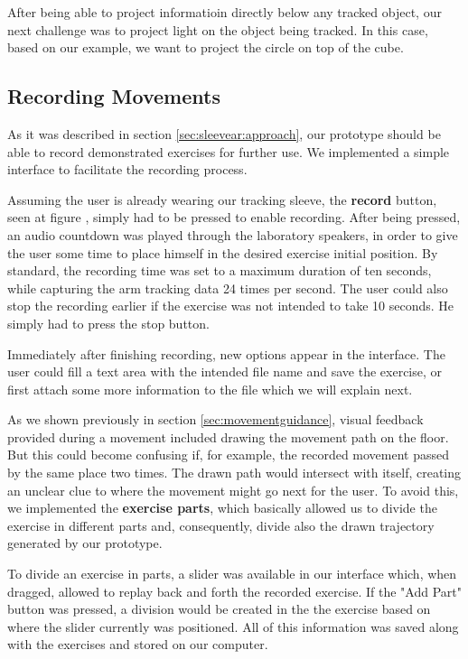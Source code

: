 
After being able to project informatioin directly below any tracked object, our next challenge was to project light on the object being tracked. In this case, based on our example, we want to project the circle on top of the cube.

\subsection{Recording Movements}

As it was described in section \ref{sec:sleevear:approach}, our prototype should be able to record demonstrated exercises for further use.
We implemented a simple interface to facilitate the recording process.

Assuming the user is already wearing our tracking sleeve, the \textbf{record} button, seen at figure , simply had to be pressed to enable recording. 
After being pressed, an audio countdown was played through the laboratory speakers, in order to give the user some time to place himself in the desired exercise initial position. 
By standard, the recording time was set to a maximum duration of ten seconds, while capturing the arm tracking data 24 times per second.
The user could also stop the recording earlier if the exercise was not intended to take 10 seconds. He simply had to press the stop button.

Immediately after finishing recording, new options appear in the interface. 
The user could fill a text area with the intended file name and save the exercise, or first attach some more information to the file which we will explain next.

As we shown previously in section \ref{sec:movementguidance}, visual feedback provided during a movement included drawing the movement path on the floor. 
But this could become confusing if, for example, the recorded movement passed by the same place two times. 
The drawn path would intersect with itself, creating an unclear clue to where the movement might go next for the user. 
To avoid this, we implemented the \textbf{exercise parts}, which basically allowed us to divide the exercise in different parts and, consequently, divide also the drawn trajectory generated by our prototype.

To divide an exercise in parts, a slider was available in our interface which, when dragged, allowed to replay back and forth the recorded exercise. 
If the "Add Part" button was pressed, a division would be created in the the exercise based on where the slider currently was positioned.
All of this information was saved along with the exercises and stored on our computer.



